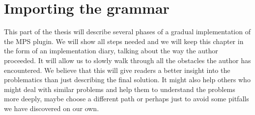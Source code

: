 \chapter{Importing the grammar}
\label{chap:importing_the_grammar}

This part of the thesis will describe several phases of a gradual implementation of the MPS plugin. We will show all steps needed and we will keep this chapter in the form of an implementation diary, talking about the way the author proceeded. It will allow us to slowly walk through all the obstacles the author has encountered. We believe that this will give readers a better insight into the problematics than just describing the final solution. It might also help others who might deal with similar problems and help them to understand the problems more deeply, maybe choose a different path or perhaps just to avoid some pitfalls we have discovered on our own.



\pagebreak

%


%


%


%


%
